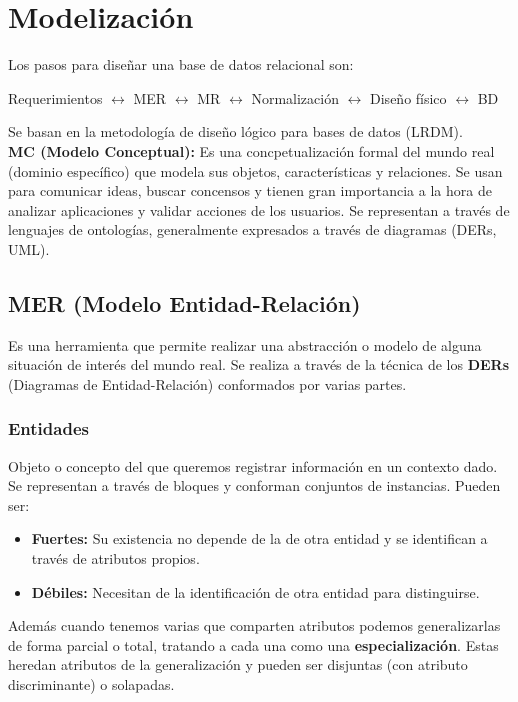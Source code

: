 \section*{Modelización}
Los pasos para diseñar una base de datos relacional son:
\begin{center}
    Requerimientos $\leftrightarrow$ MER $\leftrightarrow$ MR $\leftrightarrow$ Normalización $\leftrightarrow$ Diseño físico $\leftrightarrow$ BD
\end{center}
Se basan en la metodología de diseño lógico para bases de datos (LRDM). \\
\textbf{MC (Modelo Conceptual):} Es una concpetualización formal del mundo real (dominio específico) que modela sus objetos, características y relaciones. Se usan para comunicar ideas, buscar concensos y tienen gran importancia a la hora de analizar aplicaciones y validar acciones de los usuarios. Se representan a través de lenguajes de ontologías, generalmente expresados a través de diagramas (DERs, UML).

\subsection*{MER (Modelo Entidad-Relación)}
Es una herramienta que permite realizar una abstracción o modelo de alguna situación de interés del mundo real. Se realiza a través de la técnica de los \textbf{DERs} (Diagramas de Entidad-Relación) conformados por varias partes.

\subsubsection*{Entidades}
Objeto o concepto del que queremos registrar información en un contexto dado. Se representan a través de bloques y conforman conjuntos de instancias. Pueden ser:
\begin{itemize}
    \item \textbf{Fuertes:} Su existencia no depende de la de otra entidad y se identifican a través de atributos propios.
    \item \textbf{Débiles:} Necesitan de la identificación de otra entidad para distinguirse.
\end{itemize}
Además cuando tenemos varias que comparten atributos podemos generalizarlas de forma parcial o total, tratando a cada una como una \textbf{especialización}. Estas heredan atributos de la generalización y pueden ser disjuntas (con atributo discriminante) o solapadas.

